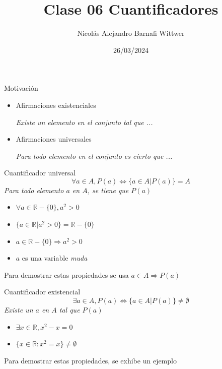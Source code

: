 \documentclass[14pt,aspectratio=169,xcolor=dvipsnames]{beamer}
\title[short title]{Clase 06 Cuantificadores}
\subtitle{}
\author[NA Barnafi] {Nicolás Alejandro Barnafi Wittwer}
\institute[UC|CMM] 
{
    Pontificia Universidad Católica de Chile \\
    Centro de Modelamiento Matemático
}
\date{26/03/2024}
\newcommand{\R}{\mathbb{R}}
\begin{document}
\begin{frame}
    \maketitle
\end{frame}
\begin{frame}{Motivación}
    \begin{itemize}
        \item Afirmaciones existenciales 
            \begin{flushright}
                \emph{Existe un elemento en el conjunto tal que ...}
            \end{flushright}
        \item Afirmaciones universales
            \begin{flushright}
                \emph{Para todo elemento en el conjunto es cierto que ...}
            \end{flushright}
    \end{itemize}
    \vspace{1cm}
\end{frame}
\begin{frame}{Cuantificador universal}
    $$ \forall a \in A, P(a) \Leftrightarrow \{a \in A|P(a)\} = A $$
    \emph{Para todo elemento $a$ en $A$, se tiene que $P(a)$}
    \pause
    \begin{itemize}
        \item $\forall a \in \mathbb R - \{0\}, a^2>0$
        \item $\{a\in \mathbb R | a^2 > 0 \} = \mathbb R - \{0\}$
        \item $a\in \mathbb R - \{0\} \Rightarrow a^2>0$
        \item $a$ es una variable \emph{muda}
    \end{itemize}
    \alert{Para demostrar estas propiedades se usa $a\in A\Rightarrow P(a)$}
\end{frame}
\begin{frame}{Cuantificador existencial}
    $$ \exists a \in A, P(a) \Leftrightarrow \{ a \in A | P(a) \} \neq \emptyset $$
    \emph{Existe un $a$ en $A$ tal que $P(a)$}
    \pause
    \begin{itemize}
        \item $\exists x \in \R, x^2-x=0$
        \item $\{x\in \R: x^2 = x\} \neq \emptyset$
    \end{itemize}
    \alert{Para demostrar estas propiedades, se exhibe un ejemplo}
\end{frame}
\end{document}
